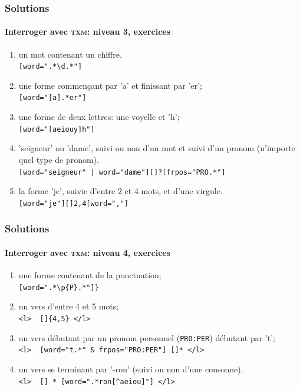 \documentclass{beamer}
\begin{document}
\begin{frame}[fragile]
\frametitle{Solutions}
\framesubtitle{Interroger avec \textsc{txm}: niveau 3, exercices}

\begin{enumerate}
	\item un mot contenant un chiffre.\\
	\texttt{[word=".*\textbackslash{}d.*"]}
	\item une forme commençant par 'a' et finissant par 'er';\\
	\texttt{[word="[a].*er"]}
	\item une forme de deux lettres: une voyelle et 'h';\\
	\texttt{[word="[aeiouy]h"]}
	\item 'seigneur' ou 'dame', suivi ou non d'un mot et suivi d'un pronom (n'importe quel type de pronom).\\
	\texttt{[word="seigneur" | word="dame"][]?[frpos="PRO.*"]}
	\item la forme 'je', suivie d'entre 2 et 4 mots, et d'une virgule.\\
	\texttt{[word="je"][]{2,4}[word=","]}
\end{enumerate}

\end{frame}

\begin{frame}[fragile]
\frametitle{Solutions}
\framesubtitle{Interroger avec \textsc{txm}: niveau 4, exercices}

\begin{enumerate}
	\item une forme contenant de la ponctuation;\\
	\verb|[word=".*\p{P}.*"]}|
	\item un vers d'entre 4 et 5 mots;\\
	\verb|<l>  []{4,5} </l>|
	\item un vers débutant par un pronom personnel (\texttt{PRO:PER}) débutant par 't';\\
	\verb|<l>  [word="t.*" & frpos="PRO:PER"] []* </l>|
	\item un vers se terminant par '-ron' (suivi ou non d'une consonne).\\
	\verb|<l>  [] * [word=".*ron[^aeiou]"] </l>|
\end{enumerate}

\end{frame}

\end{document}
